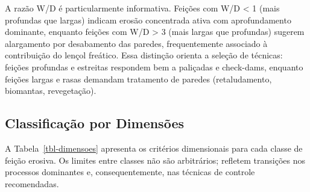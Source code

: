 \documentclass[
  portuguese,
  11pt,
  a4paper,
  open=any]{scrbook}
\begin{document}
A razão W/D é particularmente informativa. Feições com W/D \textless{} 1
(mais profundas que largas) indicam erosão concentrada ativa com
aprofundamento dominante, enquanto feições com W/D \textgreater{} 3
(mais largas que profundas) sugerem alargamento por desabamento das
paredes, frequentemente associado à contribuição do lençol freático.
Essa distinção orienta a seleção de técnicas: feições profundas e
estreitas respondem bem a paliçadas e check-dams, enquanto feições
largas e rasas demandam tratamento de paredes (retaludamento, biomantas,
revegetação).

\subsection{Classificação por
Dimensões}\label{classificauxe7uxe3o-por-dimensuxf5es}

A Tabela~\ref{tbl-dimensoes} apresenta os critérios dimensionais para
cada classe de feição erosiva. Os limites entre classes não são
arbitrários; refletem transições nos processos dominantes e,
consequentemente, nas técnicas de controle recomendadas.
\end{document}
